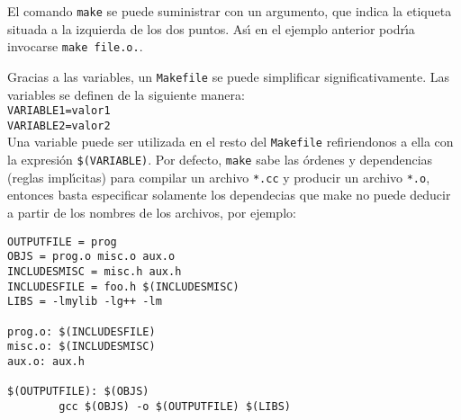 El comando \verb+make+ se puede suministrar con un argumento, que
indica la etiqueta situada a la izquierda de los dos puntos. As{\'\i} en el
ejemplo anterior podr{\'\i}a invocarse \verb+make file.o.+. 

Gracias a las variables, un \verb+Makefile+ se puede simplificar
significativamente. Las variables se definen de la siguiente manera:\\
{\tt VARIABLE1=valor1}\\
{\tt VARIABLE2=valor2 }\\
Una variable puede ser utilizada en el resto del \verb+Makefile+
refiriendonos a ella con la expresi{\'o}n {\tt \$(VARIABLE)}.  Por
defecto, \verb+make+ sabe las {\'o}rdenes y dependencias (reglas
impl{\'\i}citas) para compilar un archivo \verb+*.cc+ y producir un archivo
\verb+*.o+, entonces basta especificar solamente los dependecias que
make no puede deducir a partir de los nombres de los archivos, por ejemplo:
\begin{verbatim}
OUTPUTFILE = prog 
OBJS = prog.o misc.o aux.o 
INCLUDESMISC = misc.h aux.h 
INCLUDESFILE = foo.h $(INCLUDESMISC) 
LIBS = -lmylib -lg++ -lm

prog.o: $(INCLUDESFILE) 
misc.o: $(INCLUDESMISC) 
aux.o: aux.h

$(OUTPUTFILE): $(OBJS)
        gcc $(OBJS) -o $(OUTPUTFILE) $(LIBS)
\end{verbatim}

